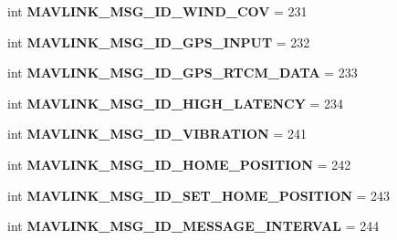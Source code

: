 \begin{DoxyCompactItemize}
int {\bfseries M\+A\+V\+L\+I\+N\+K\+\_\+\+M\+S\+G\+\_\+\+I\+D\+\_\+\+W\+I\+N\+D\+\_\+\+C\+OV} = 231
\item 
\mbox{\label{namespacepymavlink_1_1dialects_1_1v10_a958fb6ac2534f982e5cca001ac3309d0}} 
int {\bfseries M\+A\+V\+L\+I\+N\+K\+\_\+\+M\+S\+G\+\_\+\+I\+D\+\_\+\+G\+P\+S\+\_\+\+I\+N\+P\+UT} = 232
\item 
\mbox{\label{namespacepymavlink_1_1dialects_1_1v10_a93cc9d60c824eae331cdf3311cdef4f2}} 
int {\bfseries M\+A\+V\+L\+I\+N\+K\+\_\+\+M\+S\+G\+\_\+\+I\+D\+\_\+\+G\+P\+S\+\_\+\+R\+T\+C\+M\+\_\+\+D\+A\+TA} = 233
\item 
\mbox{\label{namespacepymavlink_1_1dialects_1_1v10_a59c29266a3f3262e59241df58dcdd1b9}} 
int {\bfseries M\+A\+V\+L\+I\+N\+K\+\_\+\+M\+S\+G\+\_\+\+I\+D\+\_\+\+H\+I\+G\+H\+\_\+\+L\+A\+T\+E\+N\+CY} = 234
\item 
\mbox{\label{namespacepymavlink_1_1dialects_1_1v10_a2d8cd42c6ade05f4957d38df2cce91c5}} 
int {\bfseries M\+A\+V\+L\+I\+N\+K\+\_\+\+M\+S\+G\+\_\+\+I\+D\+\_\+\+V\+I\+B\+R\+A\+T\+I\+ON} = 241
\item 
\mbox{\label{namespacepymavlink_1_1dialects_1_1v10_a7ccd9f0b01c9ab687a201b05f96536b5}} 
int {\bfseries M\+A\+V\+L\+I\+N\+K\+\_\+\+M\+S\+G\+\_\+\+I\+D\+\_\+\+H\+O\+M\+E\+\_\+\+P\+O\+S\+I\+T\+I\+ON} = 242
\item 
\mbox{\label{namespacepymavlink_1_1dialects_1_1v10_a4d6cb3278d43146643a52cfe10c2f2ac}} 
int {\bfseries M\+A\+V\+L\+I\+N\+K\+\_\+\+M\+S\+G\+\_\+\+I\+D\+\_\+\+S\+E\+T\+\_\+\+H\+O\+M\+E\+\_\+\+P\+O\+S\+I\+T\+I\+ON} = 243
\item 
\mbox{\label{namespacepymavlink_1_1dialects_1_1v10_ae39e75cba09107651dc876cd0dc679c2}} 
int {\bfseries M\+A\+V\+L\+I\+N\+K\+\_\+\+M\+S\+G\+\_\+\+I\+D\+\_\+\+M\+E\+S\+S\+A\+G\+E\+\_\+\+I\+N\+T\+E\+R\+V\+AL} = 244
\item 
\mbox{\label{namespacepymavlink_1_1dialects_1_1v10_a2fe420197a0e8a28ffa1b34bf7d62b8d}} 

\end{DoxyCompactItemize}
